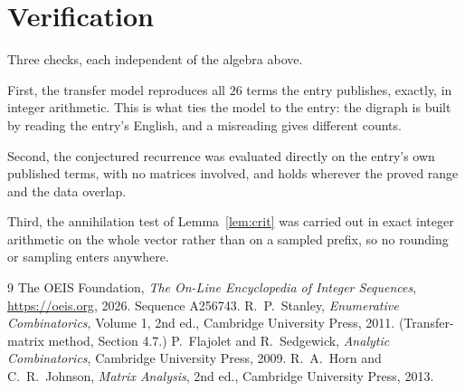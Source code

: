 \documentclass[11pt,a4paper]{article}
\theoremstyle{plain}
\theoremstyle{definition}
\begin{document}
\section{Verification}

Three checks, each independent of the algebra above.

First, the transfer model reproduces all $26$ terms the entry publishes, exactly, in
integer arithmetic. This is what ties the model to the entry: the digraph is built by reading
the entry's English, and a misreading gives different counts.

Second, the conjectured recurrence was evaluated directly on the entry's own published terms,
with no matrices involved, and holds wherever the proved range and the data overlap.

Third, the annihilation test of Lemma~\ref{lem:crit} was carried out in exact integer
arithmetic on the whole vector rather than on a sampled prefix, so no rounding or sampling
enters anywhere.

\begin{thebibliography}{9}
 The OEIS Foundation, \emph{The On-Line Encyclopedia of Integer
Sequences}, \url{https://oeis.org}, 2026. Sequence A256743.
 R.~P.~Stanley, \emph{Enumerative Combinatorics}, Volume 1, 2nd ed.,
Cambridge University Press, 2011. (Transfer-matrix method, Section 4.7.)
 P.~Flajolet and R.~Sedgewick, \emph{Analytic Combinatorics}, Cambridge
University Press, 2009.
 R.~A.~Horn and C.~R.~Johnson, \emph{Matrix Analysis}, 2nd ed., Cambridge
University Press, 2013.
\end{thebibliography}
\end{document}
